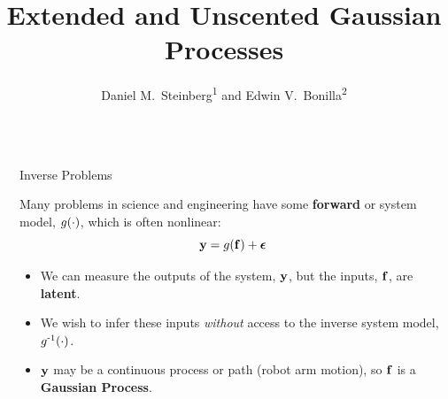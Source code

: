 \documentclass[final]{beamer}
\title{Extended and Unscented Gaussian Processes} %
\author{Daniel M.\ Steinberg\textsuperscript{1} and
        Edwin V.\ Bonilla\textsuperscript{2}} %
\institute{\textsuperscript{1}NICTA, 
           \textsuperscript{2}The University of New South Wales} %
\newlength{\sepwid}
\newlength{\onecolwid}
\begin{document}


\begin{frame}[t] %

\begin{columns}[t] %

\begin{column}{\sepwid}\end{column} %

\begin{column}{\onecolwid} %



\begin{alertblock}{Inverse Problems}

Many problems in science and engineering have some \textbf{forward} or system
model, $g\!\left({{\cdot}}\right)$, which is often nonlinear:
\begin{equation*}
    \mathbf{y} = g\!\left({{\mathbf{f}}}\right) + \boldsymbol\epsilon
\end{equation*}
\vspace{-2cm}
\begin{itemize}
    \item We can measure the outputs of the system, $\mathbf{y}$, but the inputs,
        $\mathbf{f}$, are \textbf{latent}.
    \item We wish to infer these inputs \emph{without} access to the inverse
        system model, $g^{\text{-}1}\!\left({{\cdot}}\right)$.
    \item $\mathbf{y}$ may be a continuous process or path (robot arm motion), 
        so $\mathbf{f}$ is a \textbf{Gaussian Process}.
\end{itemize}

\end{alertblock}



\end{column}
\end{columns}
\end{frame}
\end{document}
